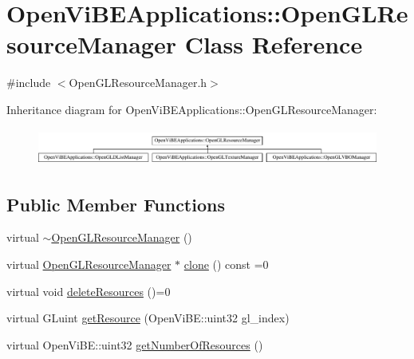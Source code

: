 \hypertarget{classOpenViBEApplications_1_1OpenGLResourceManager}{
\section{OpenViBEApplications::OpenGLResourceManager Class Reference}
\label{classOpenViBEApplications_1_1OpenGLResourceManager}
}


{\ttfamily \#include $<$OpenGLResourceManager.h$>$}

Inheritance diagram for OpenViBEApplications::OpenGLResourceManager:\begin{figure}[H]
\begin{center}
\leavevmode
\includegraphics[height=1.220044cm]{classOpenViBEApplications_1_1OpenGLResourceManager}
\end{center}
\end{figure}
\subsection*{Public Member Functions}
\begin{DoxyCompactItemize}
\item 
virtual \hyperlink{classOpenViBEApplications_1_1OpenGLResourceManager_a3638ba76e125528400dca2b50a98a202}{$\sim$OpenGLResourceManager} ()
\item 
virtual \hyperlink{classOpenViBEApplications_1_1OpenGLResourceManager}{OpenGLResourceManager} $\ast$ \hyperlink{classOpenViBEApplications_1_1OpenGLResourceManager_aa936af09f4279ef5ce372dbfdb91f57d}{clone} () const =0
\item 
virtual void \hyperlink{classOpenViBEApplications_1_1OpenGLResourceManager_af077b20ea2602b4de7981113ee8dd007}{deleteResources} ()=0
\item 
virtual GLuint \hyperlink{classOpenViBEApplications_1_1OpenGLResourceManager_abef13a58f507a240f06b04d6f4d25395}{getResource} (OpenViBE::uint32 gl\_\-index)
\item 
virtual OpenViBE::uint32 \hyperlink{classOpenViBEApplications_1_1OpenGLResourceManager_afe28173810af46fe806cf3d69831bbc0}{getNumberOfResources} ()
\end{DoxyCompactItemize}
